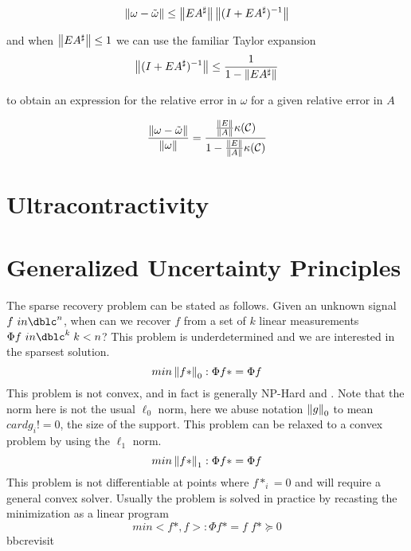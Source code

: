 \begin{equation}
\left\Vert\omega - \tilde{\omega}\right\Vert \leq \left\Vert E A^\sharp\right\Vert \left\Vert (I+E A^\sharp)^{-1}\right\Vert
\end{equation}

and when $\left\Vert E A^\sharp\right\Vert \leq 1$ we can use the familiar Taylor expansion
\begin{equation}
\left\Vert(I+E A^\sharp)^{-1}\right\Vert \leq \frac{1}{ 1 - \left\Vert E A^\sharp \right\Vert }
\end{equation}

to obtain an expression for the relative error in $\omega$ for a given relative error in $A$

\begin{equation}
\frac{\left\Vert\omega - \tilde{\omega}\right\Vert}{\left\Vert\omega\right\Vert} = \frac{ \frac{\left\Vert E\right\Vert}{\left\Vert A\right\Vert} \kappa(\mathcal{C}) } {1 - \frac{\left\Vert E\right\Vert}{\left\Vert A\right\Vert} \kappa(\mathcal{C}) }
\end{equation}



\section{Ultracontractivity}


\section{Generalized Uncertainty Principles}
The sparse recovery problem can be stated as follows.  Given an unknown signal $f \ in \dblc^n$, when can we recover $f$ from a set of $k$ linear measurements $\Phi f \ in \dblc^k \; k<n$? This problem is underdetermined and we are interested in the sparsest solution.
\begin{equation*}
min \left\Vert f*\right\Vert_0 : \Phi f* = \Phi f
\end{equation*}
This problem is not convex, and in fact is generally NP-Hard \cite{Donoho04formost} and \cite{natarajan1995sparse}.  Note that the norm here is not the usual $\ell_0$ norm, here we abuse notation $\left\Vert g\right\Vert_0$ to mean $card{g_i ! = 0}$, the size of the support. This problem can be relaxed to a convex problem by using the $\ell_1$ norm.
\begin{equation*}
min \left\Vert f*\right\Vert_1 : \Phi f* = \Phi f
\end{equation*}
This problem is not differentiable at points where $f*_i=0$ and will require a general convex solver.  Usually the problem is solved in practice by recasting the minimization as a linear program
\begin{equation*}
min <f*,f> : \Phi f* = f \;  f* \succeq 0
\end{equation*}
bbcrevisit

